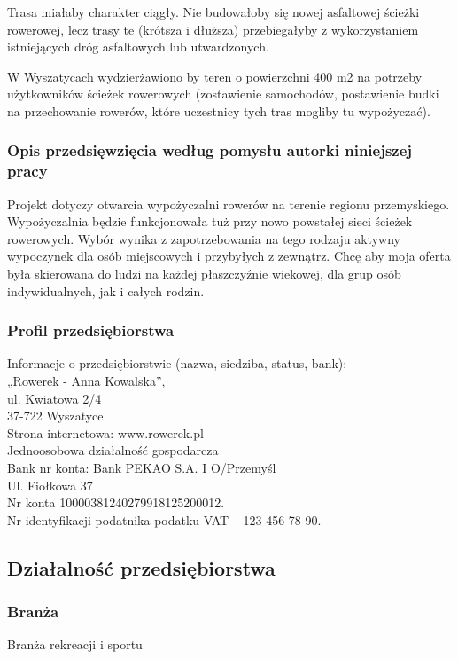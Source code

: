 \documentclass{sprawozdanie-agh}
\begin{document}
		Trasa miałaby charakter ciągły. Nie budowałoby się nowej asfaltowej ścieżki rowerowej, lecz trasy te (krótsza i dłuższa) przebiegałyby z wykorzystaniem istniejących dróg asfaltowych lub utwardzonych.
	 
		W Wyszatycach wydzierżawiono by teren o powierzchni 400 m2 na potrzeby użytkowników ścieżek rowerowych (zostawienie samochodów, postawienie budki na przechowanie  rowerów, które uczestnicy tych tras mogliby tu wypożyczać).
	
		\subsubsection{Opis przedsięwzięcia według pomysłu autorki niniejszej pracy}
		
		Projekt dotyczy otwarcia wypożyczalni rowerów na terenie regionu przemyskiego. Wypożyczalnia będzie funkcjonowała tuż przy nowo powstałej sieci ścieżek rowerowych. Wybór wynika z zapotrzebowania na tego rodzaju aktywny wypoczynek dla osób miejscowych i przybyłych z zewnątrz. Chcę aby moja oferta była skierowana do ludzi na każdej płaszczyźnie wiekowej, dla grup osób indywidualnych, jak i całych rodzin.
		
		\subsubsection{Profil przedsiębiorstwa}
		Informacje o przedsiębiorstwie (nazwa, siedziba, status, bank):\\
		„Rowerek - Anna Kowalska”,\\
		ul. Kwiatowa 2/4\\
		37-722 Wyszatyce.\\
		Strona internetowa: www.rowerek.pl\\
		Jednoosobowa działalność gospodarcza\\
		Bank nr konta: Bank PEKAO S.A. I O/Przemyśl\\
		Ul. Fiołkowa 37\\
		Nr konta 10000381240279918125200012.\\
		Nr identyfikacji podatnika podatku VAT – 123-456-78-90.
		
		\subsection{Działalność przedsiębiorstwa}

		\subsubsection{Branża}
		Branża rekreacji i sportu
\end{document}
